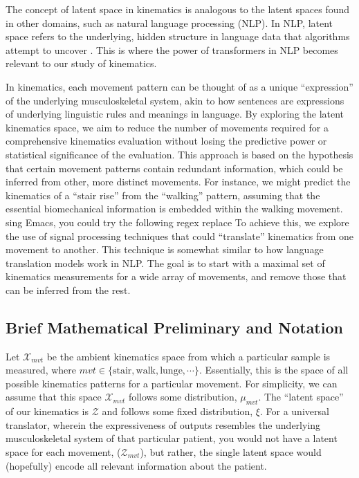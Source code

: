 The concept of latent space in kinematics is analogous to the latent spaces found in other domains, such as natural language processing (NLP).
In NLP, latent space refers to the underlying, hidden structure in language data that algorithms attempt to uncover \cite{jurafskySpeechLanguageProcessing2009}.
This is where the power of transformers \cite{vaswaniAttentionAllYou2017} in NLP becomes relevant to our study of kinematics.

In kinematics, each movement pattern can be thought of as a unique ``expression'' of the underlying musculoskeletal system, akin to how sentences are expressions of underlying linguistic rules and meanings in language.
By exploring the latent kinematics space, we aim to reduce the number of movements required for a comprehensive kinematics evaluation without losing the predictive power or statistical significance of the evaluation.
This approach is based on the hypothesis that certain movement patterns contain redundant information, which could be inferred from other, more distinct movements.
For instance, we might predict the kinematics of a ``stair rise'' from the ``walking'' pattern, assuming that the essential biomechanical information is embedded within the walking movement.
sing Emacs, you could try the following regex replace
To achieve this, we explore the use of signal processing techniques that could ``translate'' kinematics from one movement to another.
This technique is somewhat similar to how language translation models work in NLP.
The goal is to start with a maximal set of kinematics measurements for a wide array of movements, and remove those that can be inferred from the rest.

\subsection{Brief Mathematical Preliminary and Notation}
Let $\mathcal{X}_{mvt}$ be the ambient kinematics space from which a particular sample is measured, where $mvt \in \{\text{stair},\text{walk}, \text{lunge}, \cdots\}$.
Essentially, this is the space of all possible kinematics patterns for a particular movement.
For simplicity, we can assume that this space $\mathcal{X}_{mvt}$ follows some distribution, $\mu_{mvt}$.
The ``latent space'' of our kinematics is $\mathcal{Z}$ and follows some fixed distribution, $\xi$.
For a universal translator, wherein the expressiveness of outputs resembles the underlying musculoskeletal system of that particular patient, you would not have a latent space for each movement, ($\mathcal{Z}_{mvt}$), but rather, the single latent space would (hopefully) encode all relevant information about the patient.


